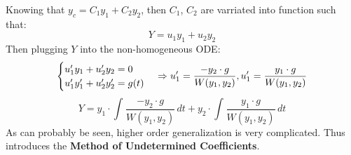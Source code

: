 \documentclass[12pt]{article}
\begin{document}
Knowing that $y_c = C_1y_1 + C_2y_2$, then $C_1$, $C_2$ are varriated into function such that:
\begin{equation*}
  Y = u_1y_1 + u_2y_2
\end{equation*}
Then plugging $Y$ into the non-homogeneous ODE:
\[
  \begin{cases} 
    u_1'y_1 + u_2'y_2 = 0 \\
    u_1'y_1' + u_2'y_2' = g(t)
  \end{cases}
  \Rightarrow u_1' = \frac{-y_2 \cdot g}{W(y_1,y_2)}, u_1' = \frac{y_1 \cdot g}{W(y_1,y_2)} \\
\]
\begin{equation*}
  Y = y_1 \cdot \int_{}^{} \frac{-y_2 \cdot g}{W(y_1,y_2)} \,dt + y_2 \cdot \int_{}^{} \frac{y_1 \cdot g}{W(y_1,y_2)} \,dt
\end{equation*}
As can probably be seen, higher order generalization is very complicated. Thus introduces the \textbf{Method of Undetermined Coefficients}.
\end{document}
